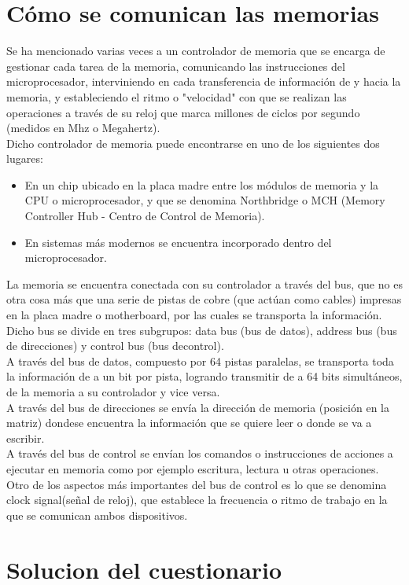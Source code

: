 \documentclass{article}
\begin{document}
\section*{Cómo se comunican las memorias}
Se ha mencionado varias veces a un controlador de memoria que se encarga de gestionar cada
tarea de la memoria, comunicando las instrucciones del microprocesador, interviniendo en
cada transferencia de información de y hacia la memoria, y estableciendo el ritmo o "velocidad"
con que se realizan las operaciones a través de su reloj que marca millones de ciclos por
segundo (medidos en Mhz o Megahertz).\\[0.1cm]
Dicho controlador de memoria puede encontrarse en uno de los siguientes dos lugares:
\begin{itemize}
\item En un chip ubicado en la placa madre entre los módulos de memoria y la CPU o
microprocesador, y que se denomina Northbridge o MCH (Memory Controller Hub -
Centro de Control de Memoria).
\item En sistemas más modernos se encuentra incorporado dentro del microprocesador.
\end{itemize}
La memoria se encuentra conectada con su controlador a través del bus, que no es otra cosa
más que una serie de pistas de cobre (que actúan como cables) impresas en la placa madre o
motherboard, por las cuales se transporta la información. Dicho bus se divide en tres
subgrupos: data bus (bus de datos), address bus (bus de direcciones) y control bus (bus decontrol).\\[0.1cm]
A través del bus de datos, compuesto por 64 pistas paralelas, se transporta toda la información
de a un bit por pista, logrando transmitir de a 64 bits simultáneos, de la memoria a su controlador y vice versa.\\[0.1cm]
A través del bus de direcciones se envía la dirección de memoria (posición en la matriz) dondese encuentra la información que se quiere leer o donde se va a escribir.\\[0.1cm]
A través del bus de control se envían los comandos o instrucciones de acciones a ejecutar en memoria como por ejemplo escritura, lectura u otras operaciones. Otro de los aspectos más importantes del bus de control es lo que se denomina clock signal(señal de reloj), que establece la frecuencia o ritmo de trabajo en la que se comunican ambos dispositivos.
\section*{Solucion del cuestionario}
\end{document}
